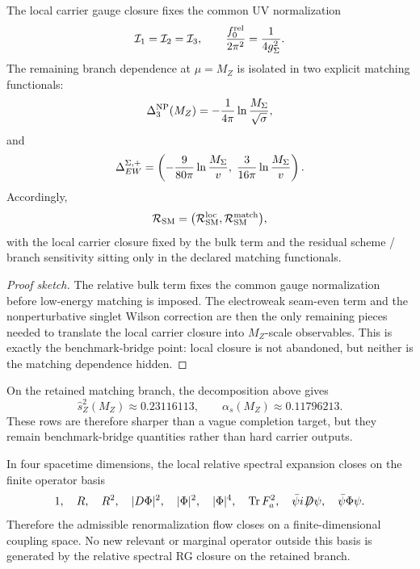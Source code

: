 \begin{proposition}
\label{prop:local-gauge-closure-matching}
The local carrier gauge closure fixes the common UV normalization
\[
\mathcal I_1=\mathcal I_2=\mathcal I_3,
\qquad
\frac{f_0^{\mathrm{rel}}}{2\pi^2}=\frac{1}{4g_\Sigma^2}.
\]
The remaining branch dependence at $\mu=M_Z$ is isolated in two explicit matching functionals:
\[
\Delta_3^{\mathrm{NP}}(M_Z)
=
-\frac{1}{4\pi}\ln\frac{M_\Sigma}{\sqrt{\sigma}},
\]
and
\[
\Delta_{EW}^{\Sigma,+}
=
\left(
-\frac{9}{80\pi}\ln\frac{M_\Sigma}{v},
\;
\frac{3}{16\pi}\ln\frac{M_\Sigma}{v}
\right).
\]
Accordingly,
\[
\mathcal R_{\mathrm{SM}}
=
\bigl(\mathcal R_{\mathrm{SM}}^{\mathrm{loc}},\mathcal R_{\mathrm{SM}}^{\mathrm{match}}\bigr),
\]
with the local carrier closure fixed by the bulk term and the residual scheme / branch sensitivity sitting only in the declared matching functionals.
\end{proposition}

\begin{proof}[Proof sketch]
The relative bulk term fixes the common gauge normalization before low-energy matching is imposed. The electroweak seam-even term and the nonperturbative singlet Wilson correction are then the only remaining pieces needed to translate the local carrier closure into $M_Z$-scale observables. This is exactly the benchmark-bridge point: local closure is not abandoned, but neither is the matching dependence hidden.
\end{proof}

\begin{remark}
On the retained matching branch, the decomposition above gives
\[
\hat s_Z^2(M_Z)\approx \num{0.23116113},
\qquad
\alpha_s(M_Z)\approx \num{0.11796213}.
\]
These rows are therefore sharper than a vague completion target, but they remain benchmark-bridge quantities rather than hard carrier outputs.
\end{remark}

\begin{proposition}
In four spacetime dimensions, the local relative spectral expansion closes on the finite operator basis
\[
1,\quad
R,\quad
R^2,\quad
|D\Phi|^2,\quad
|\Phi|^2,\quad
|\Phi|^4,\quad
\operatorname{Tr} F_a^2,\quad
\bar\psi i\!\not\!\!D\psi,\quad
\bar\psi\Phi\psi.
\]
Therefore the admissible renormalization flow closes on a finite-dimensional coupling space. No new relevant or marginal operator outside this basis is generated by the relative spectral RG closure on the retained branch.
\end{proposition}

